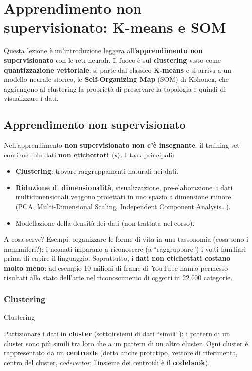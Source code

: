 \chapter{Apprendimento non supervisionato: K-means e SOM}\label{ch-19}

Questa lezione è un'introduzione leggera all'\textbf{apprendimento non
supervisionato} con le reti neurali. Il fuoco è sul \textbf{clustering}
visto come \textbf{quantizzazione vettoriale}: si parte dal classico
\textbf{K-means} e si arriva a un modello neurale storico, le
\textbf{Self-Organizing Map} (SOM) di Kohonen, che aggiungono al
clustering la proprietà di preservare la topologia e quindi di
visualizzare i dati.

\section{Apprendimento non
supervisionato}\label{apprendimento-non-supervisionato}

Nell'apprendimento \textbf{non supervisionato non c'è insegnante}: il
training set contiene solo dati \textbf{non etichettati}
\(\langle \mathbf{x}\rangle\). I task principali:

\begin{itemize}
\tightlist
\item
  \textbf{Clustering}: trovare raggruppamenti naturali nei dati.
\item
  \textbf{Riduzione di dimensionalità}, visualizzazione,
  pre-elaborazione: i dati multidimensionali vengono proiettati in uno
  spazio a dimensione minore (PCA, Multi-Dimensional Scaling,
  Independent Component Analysis\ldots).
\item
  Modellazione della densità dei dati (non trattata nel corso).
\end{itemize}

A cosa serve? Esempi: organizzare le forme di vita in una tassonomia
(cosa sono i mammiferi?); i neonati imparano a riconoscere (a
``raggruppare'') i volti familiari prima di capire il linguaggio.
Soprattutto, i \textbf{dati non etichettati costano molto meno}: ad
esempio 10 milioni di frame di YouTube hanno permesso risultati allo
stato dell'arte nel riconoscimento di oggetti in 22.000 categorie.

\subsection{Clustering}\label{clustering}

\begin{boxdefinition}{Clustering}

Partizionare i dati in \textbf{cluster} (sottoinsiemi di dati
``simili''): i pattern di un cluster sono più simili tra loro che a un
pattern di un altro cluster. Ogni cluster è rappresentato da un
\textbf{centroide} (detto anche prototipo, vettore di riferimento,
centro del cluster, \emph{codevector}; l'insieme dei centroidi è il
\textbf{codebook}).

\end{boxdefinition}

